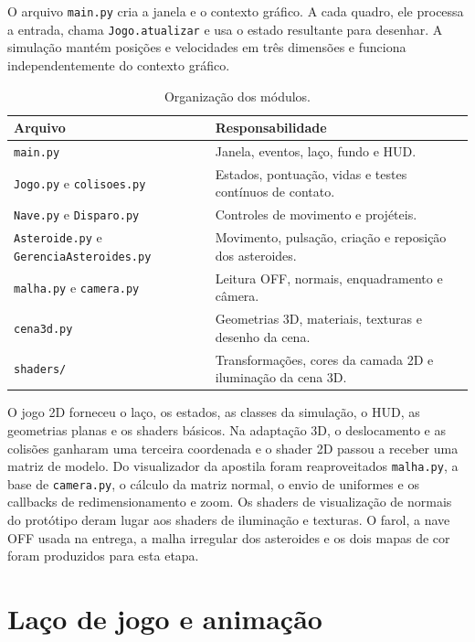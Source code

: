 \documentclass[12pt,a4paper]{article}
\begin{document}
O arquivo \texttt{main.py} cria a janela e o contexto gráfico. A cada quadro, ele processa a entrada, chama \texttt{Jogo.atualizar} e usa o estado resultante para desenhar. A simulação mantém posições e velocidades em três dimensões e funciona independentemente do contexto gráfico.

\begin{table}[H]
\centering\small
\begin{tabularx}{\textwidth}{>{\raggedright\arraybackslash}p{5.1cm}X}
\toprule
Arquivo & Responsabilidade \\
\midrule
\texttt{main.py} & Janela, eventos, laço, fundo e HUD. \\
\texttt{Jogo.py} e \texttt{colisoes.py} & Estados, pontuação, vidas e testes contínuos de contato. \\
\texttt{Nave.py} e \texttt{Disparo.py} & Controles de movimento e projéteis. \\
\texttt{Asteroide.py} e \texttt{GerenciaAsteroides.py} & Movimento, pulsação, criação e reposição dos asteroides. \\
\texttt{malha.py} e \texttt{camera.py} & Leitura OFF, normais, enquadramento e câmera. \\
\texttt{cena3d.py} & Geometrias 3D, materiais, texturas e desenho da cena. \\
\texttt{shaders/} & Transformações, cores da camada 2D e iluminação da cena 3D. \\
\bottomrule
\end{tabularx}
\caption{Organização dos módulos.}
\end{table}

O jogo 2D forneceu o laço, os estados, as classes da simulação, o HUD, as geometrias planas e os shaders básicos. Na adaptação 3D, o deslocamento e as colisões ganharam uma terceira coordenada e o shader 2D passou a receber uma matriz de modelo. Do visualizador da apostila foram reaproveitados \texttt{malha.py}, a base de \texttt{camera.py}, o cálculo da matriz normal, o envio de uniformes e os callbacks de redimensionamento e zoom. Os shaders de visualização de normais do protótipo deram lugar aos shaders de iluminação e texturas. O farol, a nave OFF usada na entrega, a malha irregular dos asteroides e os dois mapas de cor foram produzidos para esta etapa.

\section{Laço de jogo e animação}
\end{document}
